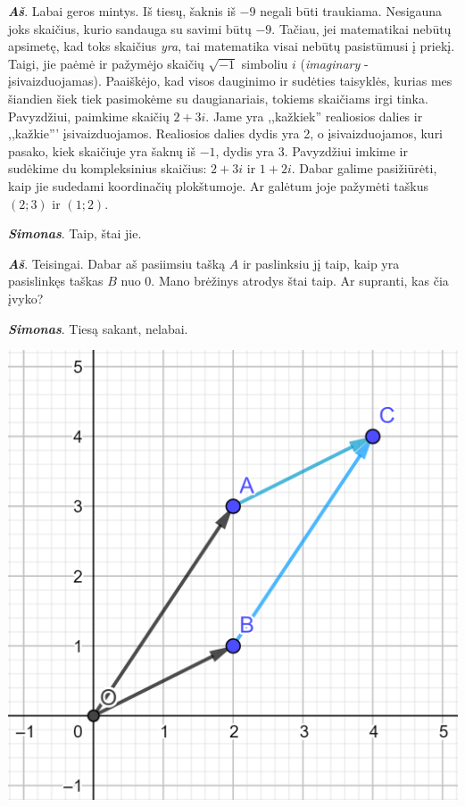\documentclass[a4paper]{article}
\newcommand{\say}[1]{\textbf{\textit{#1}}}
\begin{document}
\begin{minipage}[b]{0.69\textwidth}
\say{Aš}. Labai geros mintys. Iš tiesų, šaknis iš $-9$ negali būti traukiama. Nesigauna joks skaičius, kurio sandauga su savimi būtų $-9$. Tačiau, jei matematikai nebūtų apsimetę, kad toks skaičius \textit{yra}, tai matematika visai nebūtų pasistūmusi į priekį. Taigi, jie paėmė ir pažymėjo skaičių $\sqrt{-1}$ simboliu $i$ (\textit{imaginary} - įsivaizduojamas). Paaiškėjo, kad visos dauginimo ir sudėties taisyklės, kurias mes šiandien šiek tiek pasimokėme su daugianariais, tokiems skaičiams irgi tinka. Pavyzdžiui, paimkime skaičių $2+3i$. Jame yra ,,kažkiek'' realiosios dalies ir ,,kažkie''' įsivaizduojamos. Realiosios dalies dydis yra 2, o įsivaizduojamos, kuri pasako, kiek skaičiuje yra šaknų iš $-1$, dydis yra 3. Pavyzdžiui imkime ir sudėkime du kompleksinius skaičius: $2+3i$ ir $1+2i$. Dabar galime pasižiūrėti, kaip jie sudedami koordinačių plokštumoje. Ar galėtum joje pažymėti taškus $(2;3)$ ir $(1;2)$. 

\say{Simonas}. Taip, štai jie.

\say{Aš}. Teisingai. Dabar aš pasiimsiu tašką $A$ ir paslinksiu jį taip, kaip yra pasislinkęs taškas $B$ nuo 0. Mano brėžinys atrodys štai taip. Ar supranti, kas čia įvyko? 

\say{Simonas}. Tiesą sakant, nelabai.
\end{minipage}
\begin{minipage}[b]{0.3\textwidth}
\includegraphics[width=\textwidth]{sudetis.png}
\end{minipage}
\end{document}
